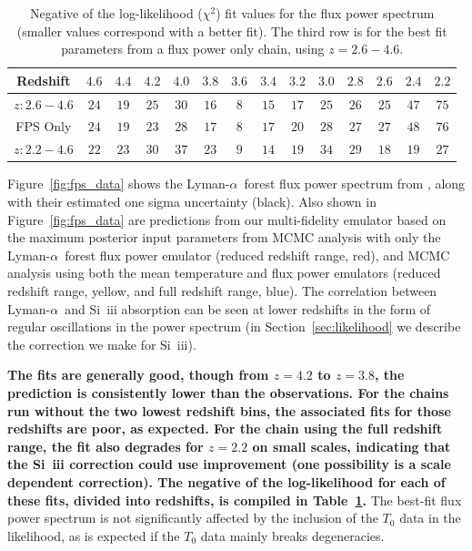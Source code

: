 \documentclass[a4paper,11pt]{article}
\newcommand{\lya}{Lyman-$\alpha$\ }
\begin{document}
\begin{table}[tbp]
	\centering
     \def\arraystretch{1.2}
     \begin{tabular}{|c|c|c|c|c|c|c|c|c|c|c|c|c|c|}
		\hline
		Redshift & $4.6$ & $4.4$ & $4.2$ & $4.0$ & $3.8$ & $3.6$ & $3.4$ & $3.2$ & $3.0$ & $2.8$ & $2.6$ & $2.4$ & $2.2$\\
		\hline \hline
        $z: 2.6-4.6$ & $24$ & $19$ & $25$ & $30$ & $16$ & $8$ & $15$ & $17$ & $25$ & $26$ & $25$ & $47$ & $75$\\
        FPS Only & $24$ & $19$ & $23$ & $28$ & $17$ & $8$ & $17$ & $20$ & $28$ & $27$ & $27$ & $48$ & $76$\\
        $z: 2.2-4.6$ & $22$ & $23$ & $30$ & $37$ & $23$ & $9$ & $14$ & $19$ & $34$ & $29$ & $18$ & $19$ & $27$\\
		\hline
	\end{tabular}
    \caption{\label{table:chi2}
    Negative of the log-likelihood ($\chi^2$) fit values for the flux power spectrum (smaller values correspond with a better fit).
    The third row is for the best fit parameters from a flux power only chain, using $z=2.6-4.6$.
    }
\end{table}

Figure~\ref{fig:fps_data} shows the \lya forest flux power spectrum from \cite{2019JCAP...07..017C}, along with their estimated one sigma uncertainty (black).
Also shown in Figure~\ref{fig:fps_data} are predictions from our multi-fidelity emulator based on the maximum posterior input parameters from MCMC analysis with only the \lya forest flux power emulator (reduced redshift range, red), and MCMC analysis using both the mean temperature and flux power emulators (reduced redshift range, yellow, and full redshift range, blue).
The correlation between \lya and Si~{\sc iii} absorption can be seen at lower redshifts in the form of regular oscillations in the power spectrum (in Section~\ref{sec:likelihood} we describe the correction we make for Si~{\sc iii}).

\textbf{The fits are generally good, though from $z=4.2$ to $z=3.8$, the prediction is consistently lower than the observations.
For the chains run without the two lowest redshift bins, the associated fits for those redshifts are poor, as expected.
For the chain using the full redshift range, the fit also degrades for $z=2.2$ on small scales, indicating that the Si~{\sc iii} correction could use improvement (one possibility is a scale dependent correction).
The negative of the log-likelihood for each of these fits, divided into redshifts, is compiled in Table~\ref{table:chi2}.}
The best-fit flux power spectrum is not significantly affected by the inclusion of the $T_0$ data in the likelihood, as is expected if the $T_0$ data mainly breaks degeneracies.
\end{document}

